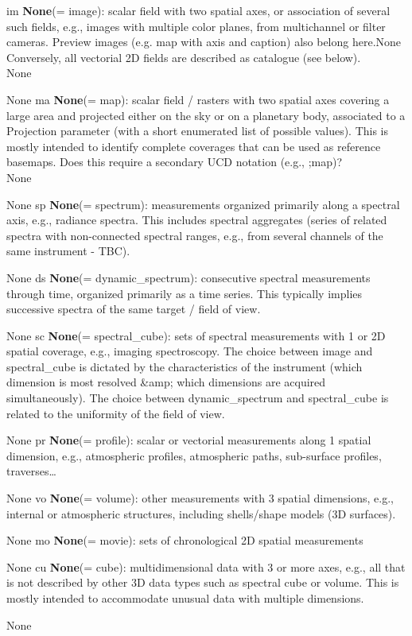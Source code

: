 \documentclass[11pt,a4paper]{ivoa}
\begin{document}
im \textbf{None}(= image): scalar field with two spatial axes, or association of several such fields, e.g., images with multiple color planes, from multichannel or filter cameras. Preview images (e.g. map with axis and caption) also belong here.None Conversely, all vectorial 2D fields are described as catalogue (see below). \\
None\item None
ma \textbf{None}(= map): scalar field / rasters with two spatial axes covering a large area and projected either on the sky or on a planetary body, associated to a Projection parameter (with a short enumerated list of possible values). This is mostly intended to identify complete coverages that can be used as reference basemaps. Does this require a secondary UCD notation (e.g., ;map)?\\
None\item None
sp \textbf{None}(= spectrum): measurements organized primarily along a spectral axis, e.g., radiance spectra. This includes spectral aggregates (series of related spectra with non-connected spectral ranges, e.g., from several channels of the same instrument - TBC).\item None
ds \textbf{None}(= dynamic_spectrum): consecutive spectral measurements through time, organized primarily as a time series. This typically implies successive spectra of the same target / field of view.\item None
sc \textbf{None}(= spectral_cube): sets of spectral measurements with 1 or 2D spatial coverage, e.g., imaging spectroscopy. The choice between image and spectral_cube is dictated by the characteristics of the instrument (which dimension is most resolved &amp; which dimensions are acquired simultaneously). The choice between dynamic_spectrum and spectral_cube is related to the uniformity of the field of view.\item None
pr \textbf{None}(= profile): scalar or vectorial measurements along 1 spatial dimension, e.g., atmospheric profiles, atmospheric paths, sub-surface profiles, traverses…\item None
vo \textbf{None}(= volume): other measurements with 3 spatial dimensions, e.g., internal or atmospheric structures, including shells/shape models (3D surfaces).\item None
mo \textbf{None}(= movie): sets of chronological 2D spatial measurements\item None
cu \textbf{None}(= cube): multidimensional data with 3 or more axes, e.g., all that is not described by other 3D data types such as spectral cube or volume. This is mostly intended to accommodate unusual data with multiple dimensions.\item None
\end{document}
